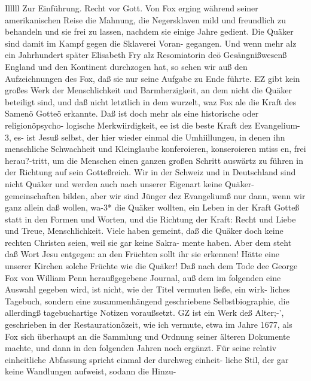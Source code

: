 Illlll Zur Einführung.
Recht vor Gott. Von Fox erging während seiner amerikanischen
Reise die Mahnung, die Negersklaven mild und freundlich zu
behandeln und sie frei zu lassen, nachdem sie einige Jahre gedient.
Die Quäker sind damit im Kampf gegen die Sklaverei Voran-
gegangen. Und wenn mehr alz ein Jahrhundert später Elisabeth
Fry alz Resomiatorin deö Gesängnißwesenß England und den
Kontinent durchzogen hat, so sehen wir auß den Aufzeichnungen
des Fox, daß sie nur seine Aufgabe zu Ende führte. EZ gibt kein
großes Werk der Menschlichkeit und Barmherzigkeit, an dem nicht
die Quäker beteiligt sind, und daß nicht letztlich in dem wurzelt,
waz Fox ale die Kraft des Samenö Gotteö erkannte.
Daß ist doch mehr als eine historische oder religionöpsycho-
logische Merkwiirdigkeit, ee ist die beste Kraft dez Evangelium-3,
es- ist Jesuß selbst, der hier wieder einmal die Umhiillungeu, in
denen ihn menschliche Schwachheit und Kleinglaube konferoieren,
konseroieren mtiss en, frei herau?-tritt, um die Menschen einen ganzen
großen Schritt auswärtz zu führen in der Richtung auf sein
Gotteßreich. Wir in der Schweiz und in Deutschland sind nicht
Quäker und werden auch nach unserer Eigenart keine Quäker-
gemeinschaften bilden, aber wir sind Jünger dez Evangeliumß
nur dann, wenn wir ganz allein daß wollen, wa-3* die Quäker
wollten, ein Leben in der Kraft Gotteß statt in den Formen
und Worten, und die Richtung der Kraft: Recht und Liebe
und Treue, Menschlichkeit. Viele haben gemeint, daß die Quäker
doch keine rechten Christen seien, weil sie gar keine Sakra-
mente haben. Aber dem steht daß Wort Jesu entgegen: an
den Früchten sollt ihr sie erkennen! Hätte eine unserer Kirchen
solche Früchte wie die Quäker!
Daß nach dem Tode dee George Fox von William Penn
heraußgegebene Journal, auß dem im folgenden eine Auswahl
gegeben wird, ist nicht, wie der Titel vermuten ließe, ein wirk-
liches Tagebuch, sondern eine zusammenhängend geschriebene
Selbstbiographie, die allerdingß tagebuchartige Notizen voraußsetzt.
GZ ist ein Werk deß Alter;-’, geschrieben in der Restaurationözeit,
wie ich vermute, etwa im Jahre 1677, als Fox sich überhaupt
an die Sammlung und Ordnung seiner älteren Dokumente machte,
und dann in den folgenden Jahren noch ergänzt. Für seine
relativ einheitliche Abfassung spricht einmal der durchweg einheit-
liche Stil, der gar keine Wandlungen aufweist, sodann die Hinzu-


